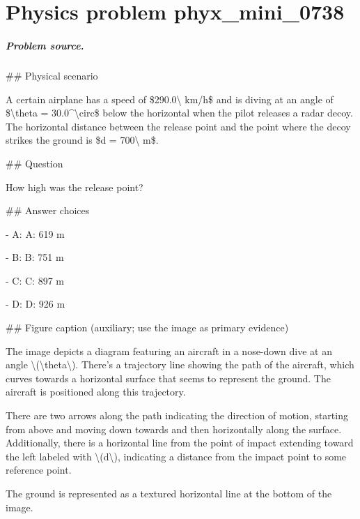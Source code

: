 
\chapter{Physics problem phyx\_mini\_0738}
\label{ch:PhyXMiniProblems_problem_phyx_mini_0738}

\paragraph{Problem source.}
\#\# Physical scenario

A certain airplane has a speed of \$290.0\textbackslash{} km/h\$ and is diving at an angle of \$\textbackslash{}theta = 30.0\textasciicircum{}\textbackslash{}circ\$ below the horizontal when the pilot releases a radar decoy. The horizontal distance between the release point and the point where the decoy strikes the ground is \$d = 700\textbackslash{} m\$.

\#\# Question

How high was the release point?

\#\# Answer choices

- A: A: 619 m

- B: B: 751 m

- C: C: 897 m

- D: D: 926 m

\#\# Figure caption (auxiliary; use the image as primary evidence)

The image depicts a diagram featuring an aircraft in a nose-down dive at an angle \textbackslash{}(\textbackslash{}theta\textbackslash{}). There's a trajectory line showing the path of the aircraft, which curves towards a horizontal surface that seems to represent the ground. The aircraft is positioned along this trajectory.

There are two arrows along the path indicating the direction of motion, starting from above and moving down towards and then horizontally along the surface. Additionally, there is a horizontal line from the point of impact extending toward the left labeled with \textbackslash{}(d\textbackslash{}), indicating a distance from the impact point to some reference point. 

The ground is represented as a textured horizontal line at the bottom of the image.

